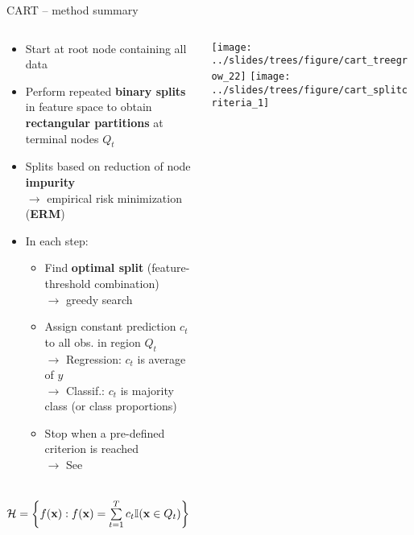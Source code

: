 \begin{frame}{CART -- method summary}

\footnotesize

 
  

\medskip

\begin{columns}[T, totalwidth=\textwidth]
\begin{column}{0.6\textwidth}
\begin{itemize}
  \item Start at root node containing all data
  \item Perform repeated \textbf{binary splits} in feature space to obtain
  \textbf{rectangular partitions} at terminal nodes $Q_t$
  \item Splits based on reduction of node \textbf{impurity} \\
  $\rightarrow$ empirical risk minimization (\textbf{ERM})
  \item In each step:
  \begin{itemize}
    \item Find \textbf{optimal split} (feature-threshold combination) \\
    $\rightarrow$ greedy search
    \item Assign constant prediction $c_t$ to all obs. in region $Q_t$\\
    $\rightarrow$ Regression: $c_t$ is average of $y$ \\
    $\rightarrow$ Classif.: $c_t$ is majority class (or class proportions)
    
  \item Stop when a pre-defined criterion is reached\\
  $\rightarrow$ See 
  \end{itemize}
\end{itemize}

\medskip

     ~~
$\mathcal{H} = \left\{ f(\mathbf{x}): f(\mathbf{x}) = \sum\limits_{t = 1}^T c_t \mathbb{I}(\mathbf{x} \in Q_t) 
\right\}$

\end{column}
\begin{column}{0.45\textwidth}
\texttt{[image: ../slides/trees/figure/cart\_treegrow\_22]}
\texttt{[image:    ../slides/trees/figure/cart\_splitcriteria\_1]} 
\end{column}
\end{columns}



\end{frame}

